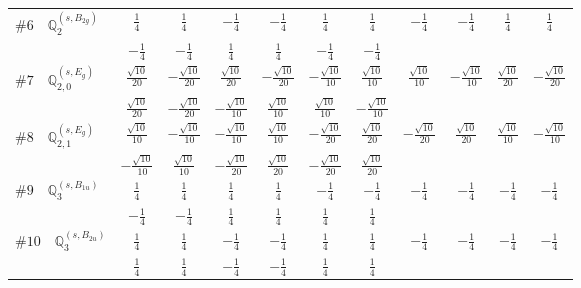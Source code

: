 \documentclass[fleqn,9pt,landscape]{jsarticle}
\begin{document}
\begin{center}
\begin{longtable}{lcccccccccc}
$ \#6\quad \mathbb{Q}_{2}^{(s,B_{2g})} $ & $ \frac{1}{4} $ & $ \frac{1}{4} $ & $ - \frac{1}{4} $ & $ - \frac{1}{4} $ & $ \frac{1}{4} $ & $ \frac{1}{4} $ & $ - \frac{1}{4} $ & $ - \frac{1}{4} $ & $ \frac{1}{4} $ & $ \frac{1}{4} $ \\
& $ - \frac{1}{4} $ & $ - \frac{1}{4} $ & $ \frac{1}{4} $ & $ \frac{1}{4} $ & $ - \frac{1}{4} $ & $ - \frac{1}{4} $ & $  $ & $  $ & $  $ & $  $ \\ \hline
$ \#7\quad \mathbb{Q}_{2,0}^{(s,E_{g})} $ & $ \frac{\sqrt{10}}{20} $ & $ - \frac{\sqrt{10}}{20} $ & $ \frac{\sqrt{10}}{20} $ & $ - \frac{\sqrt{10}}{20} $ & $ - \frac{\sqrt{10}}{10} $ & $ \frac{\sqrt{10}}{10} $ & $ \frac{\sqrt{10}}{10} $ & $ - \frac{\sqrt{10}}{10} $ & $ \frac{\sqrt{10}}{20} $ & $ - \frac{\sqrt{10}}{20} $ \\
& $ \frac{\sqrt{10}}{20} $ & $ - \frac{\sqrt{10}}{20} $ & $ - \frac{\sqrt{10}}{10} $ & $ \frac{\sqrt{10}}{10} $ & $ \frac{\sqrt{10}}{10} $ & $ - \frac{\sqrt{10}}{10} $ & $  $ & $  $ & $  $ & $  $ \\ \hline
$ \#8\quad \mathbb{Q}_{2,1}^{(s,E_{g})} $ & $ \frac{\sqrt{10}}{10} $ & $ - \frac{\sqrt{10}}{10} $ & $ - \frac{\sqrt{10}}{10} $ & $ \frac{\sqrt{10}}{10} $ & $ - \frac{\sqrt{10}}{20} $ & $ \frac{\sqrt{10}}{20} $ & $ - \frac{\sqrt{10}}{20} $ & $ \frac{\sqrt{10}}{20} $ & $ \frac{\sqrt{10}}{10} $ & $ - \frac{\sqrt{10}}{10} $ \\
& $ - \frac{\sqrt{10}}{10} $ & $ \frac{\sqrt{10}}{10} $ & $ - \frac{\sqrt{10}}{20} $ & $ \frac{\sqrt{10}}{20} $ & $ - \frac{\sqrt{10}}{20} $ & $ \frac{\sqrt{10}}{20} $ & $  $ & $  $ & $  $ & $  $ \\ \hline
$ \#9\quad \mathbb{Q}_{3}^{(s,B_{1u})} $ & $ \frac{1}{4} $ & $ \frac{1}{4} $ & $ \frac{1}{4} $ & $ \frac{1}{4} $ & $ - \frac{1}{4} $ & $ - \frac{1}{4} $ & $ - \frac{1}{4} $ & $ - \frac{1}{4} $ & $ - \frac{1}{4} $ & $ - \frac{1}{4} $ \\
& $ - \frac{1}{4} $ & $ - \frac{1}{4} $ & $ \frac{1}{4} $ & $ \frac{1}{4} $ & $ \frac{1}{4} $ & $ \frac{1}{4} $ & $  $ & $  $ & $  $ & $  $ \\ \hline
$ \#10\quad \mathbb{Q}_{3}^{(s,B_{2u})} $ & $ \frac{1}{4} $ & $ \frac{1}{4} $ & $ - \frac{1}{4} $ & $ - \frac{1}{4} $ & $ \frac{1}{4} $ & $ \frac{1}{4} $ & $ - \frac{1}{4} $ & $ - \frac{1}{4} $ & $ - \frac{1}{4} $ & $ - \frac{1}{4} $ \\
& $ \frac{1}{4} $ & $ \frac{1}{4} $ & $ - \frac{1}{4} $ & $ - \frac{1}{4} $ & $ \frac{1}{4} $ & $ \frac{1}{4} $ & $  $ & $  $ & $  $ & $  $ \\ \hline

\end{longtable}
\end{center}
\end{document}
